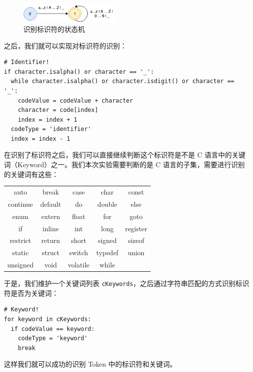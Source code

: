 \documentclass[UTF8]{ctexart}
\begin{document}
\begin{figure}[h]
  \centering
  \includegraphics[width=0.45\textwidth]{images/identifier.png}
  \caption{识别标识符的状态机}
  \label{fig:figure2}
\end{figure}

之后，我们就可以实现对标识符的识别：

\begin{verbatim}
# Identifier!
if character.isalpha() or character == '_':
  while character.isalpha() or character.isdigit() or character == '_':
    codeValue = codeValue + character
    character = code[index]
    index = index + 1
  codeType = 'identifier'
  index = index - 1
\end{verbatim}

在识别了标识符之后，我们可以直接继续判断这个标识符是不是 C 语言中的关键词（Keyword）之一。我们本次实验需要判断的是 C 语言的子集，需要进行识别的关键词有这些：

\begin{center}
  \captionsetup{position=above}
  \begin{tabular}{c|c|c|c|c}
    \hline
    auto & break & case & char & const \\
    continue & default & do & double & else \\
    enum & extern & float & for & goto \\
    if & inline & int & long & register \\
    restrict & return & short & signed & sizeof \\
    static & struct & switch & typedef & union \\
    unsigned & void & volatile & while \\
    \hline
  \end{tabular}
\end{center}

于是，我们维护一个关键词列表 \texttt{cKeywords}，之后通过字符串匹配的方式识别标识符是否为关键词：

\begin{verbatim}
# Keyword!
for keyword in cKeywords:
  if codeValue == keyword:
    codeType = 'keyword'
    break
\end{verbatim}

这样我们就可以成功的识别 Token 中的标识符和关键词。
\end{document}

